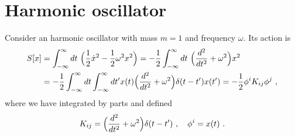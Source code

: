 \section{Harmonic oscillator}

    Consider an harmonic oscillator with mass $m=1$ and frequency $\omega$. Its action is 
    \begin{equation*}
    \begin{aligned}
        S[x] & = \int_{-\infty}^\infty dt ~ \Big ( \frac{1}{2} \dot x^2 - \frac{1}{2} \omega^2 x^2 \Big) = - \frac{1}{2} \int_{-\infty}^\infty dt ~ \Big (\frac{d^2}{dt^2} + \omega^2 \Big) x^2 \\ & = - \frac{1}{2} \int_{-\infty}^\infty dt \int_{-\infty}^\infty dt' x(t) \Big (\frac{d^2}{dt^2} + \omega^2 \Big) \delta (t - t') x(t') = - \frac{1}{2} \phi^i K_{ij} \phi^j ~,
    \end{aligned}
    \end{equation*}
    where we have integrated by parts and defined 
    \begin{equation*}
        K_{ij} = \Big (\frac{d^2}{dt^2} + \omega^2 \Big) \delta (t - t') ~, \quad \phi^i = x(t) ~.
    \end{equation*}

